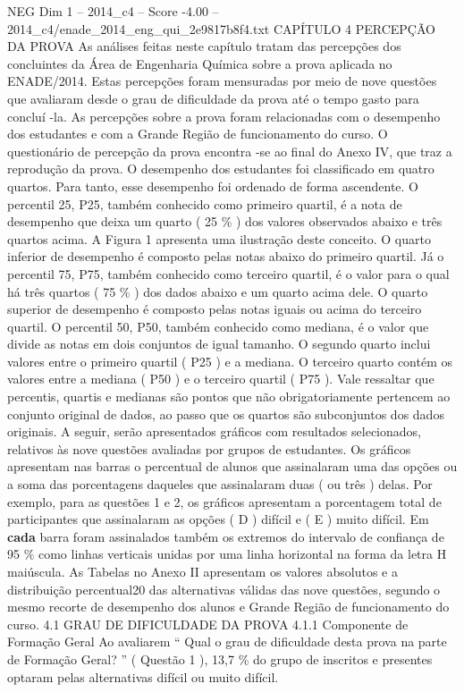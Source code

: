 \begin{textsample}{NEG Dim 1 – 2014\_c4 – Score -4.00 – 2014\_c4/enade\_2014\_eng\_qui\_2e9817b8f4.txt}  \label{ex:f1_neg_124}
CAPÍTULO 4 PERCEPÇÃO DA PROVA As análises feitas neste capítulo tratam das percepções dos concluintes da Área de Engenharia Química sobre a prova aplicada no ENADE/2014.
Estas percepções foram mensuradas por meio de nove questões que avaliaram desde o grau de dificuldade da prova até o tempo gasto para concluí -la.
As percepções sobre a prova foram relacionadas com o desempenho dos estudantes e com a Grande Região de funcionamento do curso.
O questionário de percepção da prova encontra -se ao final do Anexo IV, que traz a reprodução da prova.
O desempenho dos estudantes foi classificado em quatro quartos.
Para tanto, esse desempenho foi ordenado de forma ascendente.
O percentil 25, P25, também conhecido como primeiro quartil, é a nota de desempenho que deixa um quarto ( 25 \% ) dos valores observados abaixo e três quartos acima.
A Figura 1 apresenta uma ilustração deste conceito.
O quarto inferior de desempenho é composto pelas notas abaixo do primeiro quartil.
Já o percentil 75, P75, também conhecido como terceiro quartil, é o valor para o qual há três quartos ( 75 \% ) dos dados abaixo e um quarto acima dele.
O quarto superior de desempenho é composto pelas notas iguais ou acima do terceiro quartil.
O percentil 50, P50, também conhecido como mediana, é o valor que divide as notas em dois conjuntos de igual tamanho.
O segundo quarto inclui valores entre o primeiro quartil ( P25 ) e a mediana.
O terceiro quarto contém os valores entre a mediana ( P50 ) e o terceiro quartil ( P75 ).
Vale ressaltar que percentis, quartis e medianas são pontos que não obrigatoriamente pertencem ao conjunto original de dados, ao passo que os quartos são subconjuntos dos dados originais.
A seguir, serão apresentados gráficos com resultados selecionados, relativos às nove questões avaliadas por grupos de estudantes.
Os gráficos apresentam nas barras o percentual de alunos que assinalaram uma das opções ou a soma das porcentagens daqueles que assinalaram duas ( ou três ) delas.
Por exemplo, para as questões 1 e 2, os gráficos apresentam a porcentagem total de participantes que assinalaram as opções ( D ) difícil e ( E ) muito difícil.
Em \textbf{cada} barra foram assinalados também os extremos do intervalo de confiança de 95 \% como linhas verticais unidas por uma linha horizontal na forma da letra H maiúscula.
As Tabelas no Anexo II apresentam os valores absolutos e a distribuição percentual20 das alternativas válidas das nove questões, segundo o mesmo recorte de desempenho dos alunos e Grande Região de funcionamento do curso. 4.1 GRAU DE DIFICULDADE DA PROVA 4.1.1 Componente de Formação Geral Ao avaliarem “ Qual o grau de dificuldade desta prova na parte de Formação Geral? ” ( Questão 1 ), 13,7 \% do grupo de inscritos e presentes optaram pelas alternativas difícil ou muito difícil.

\end{textsample}
